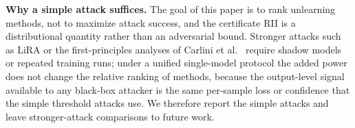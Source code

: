 \documentclass[smallextended]{svjour3}       %
\begin{document}
\textbf{Why a simple attack suffices.} The goal of this paper is to rank unlearning methods, not to maximize attack success, and the certificate RII is a distributional quantity rather than an adversarial bound. Stronger attacks such as LiRA or the first-principles analyses of Carlini et al.~\cite{carlini2022membership} require shadow models or repeated training runs; under a unified single-model protocol the added power does not change the relative ranking of methods, because the output-level signal available to any black-box attacker is the same per-sample loss or confidence that the simple threshold attacks use. We therefore report the simple attacks and leave stronger-attack comparisons to future work.


\end{document}
